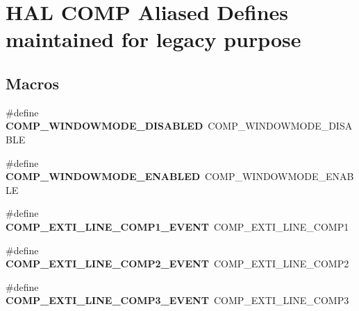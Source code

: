 \hypertarget{group___h_a_l___c_o_m_p___aliased___defines}{}\section{H\+AL C\+O\+MP Aliased Defines maintained for legacy purpose}
\label{group___h_a_l___c_o_m_p___aliased___defines}
\subsection*{Macros}
\begin{DoxyCompactItemize}
\item 
\mbox{\label{group___h_a_l___c_o_m_p___aliased___defines_gab9e0400639ad2179b63e519e08741c05}} 
\#define {\bfseries C\+O\+M\+P\+\_\+\+W\+I\+N\+D\+O\+W\+M\+O\+D\+E\+\_\+\+D\+I\+S\+A\+B\+L\+ED}~C\+O\+M\+P\+\_\+\+W\+I\+N\+D\+O\+W\+M\+O\+D\+E\+\_\+\+D\+I\+S\+A\+B\+LE
\item 
\mbox{\label{group___h_a_l___c_o_m_p___aliased___defines_gab481c80a4a4235ca54d2dd39db70926c}} 
\#define {\bfseries C\+O\+M\+P\+\_\+\+W\+I\+N\+D\+O\+W\+M\+O\+D\+E\+\_\+\+E\+N\+A\+B\+L\+ED}~C\+O\+M\+P\+\_\+\+W\+I\+N\+D\+O\+W\+M\+O\+D\+E\+\_\+\+E\+N\+A\+B\+LE
\item 
\mbox{\label{group___h_a_l___c_o_m_p___aliased___defines_gaa53df1592afaa8d2a7d2f417273a50a7}} 
\#define {\bfseries C\+O\+M\+P\+\_\+\+E\+X\+T\+I\+\_\+\+L\+I\+N\+E\+\_\+\+C\+O\+M\+P1\+\_\+\+E\+V\+E\+NT}~C\+O\+M\+P\+\_\+\+E\+X\+T\+I\+\_\+\+L\+I\+N\+E\+\_\+\+C\+O\+M\+P1
\item 
\mbox{\label{group___h_a_l___c_o_m_p___aliased___defines_gae128dfe3b90b2c0e51cde7de5987f9ef}} 
\#define {\bfseries C\+O\+M\+P\+\_\+\+E\+X\+T\+I\+\_\+\+L\+I\+N\+E\+\_\+\+C\+O\+M\+P2\+\_\+\+E\+V\+E\+NT}~C\+O\+M\+P\+\_\+\+E\+X\+T\+I\+\_\+\+L\+I\+N\+E\+\_\+\+C\+O\+M\+P2
\item 
\mbox{\label{group___h_a_l___c_o_m_p___aliased___defines_ga30c7118ab9b9cbfa8e40870ee9e747b6}} 
\#define {\bfseries C\+O\+M\+P\+\_\+\+E\+X\+T\+I\+\_\+\+L\+I\+N\+E\+\_\+\+C\+O\+M\+P3\+\_\+\+E\+V\+E\+NT}~C\+O\+M\+P\+\_\+\+E\+X\+T\+I\+\_\+\+L\+I\+N\+E\+\_\+\+C\+O\+M\+P3

\end{DoxyCompactItemize}
